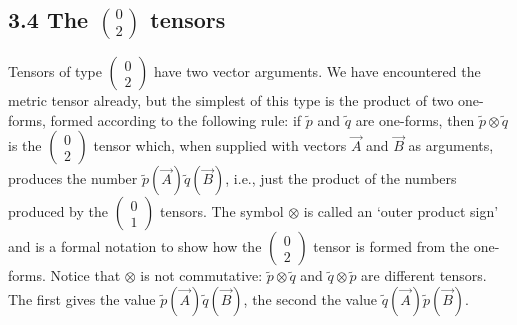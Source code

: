 \documentclass[12pt]{book}
\begin{document}
    \subsection{3.4 The \(\binom{0}{2}\) tensors}
    Tensors of type \(\left(\begin{array}{c} 0 \\ 2 \end{array}\right)\) have two vector arguments. We have encountered the metric tensor already, but the simplest of this type is the product of two one-forms, formed according to the following rule: if \(\tilde{p}\) and \(\tilde{q}\) are one-forms, then \(\tilde{p} \otimes \tilde{q}\) is the \(\left(\begin{array}{c} 0 \\ 2 \end{array}\right)\) tensor which, when supplied with vectors \(\vec{A}\) and \(\vec{B}\) as arguments, produces the number \(\tilde{p}(\vec{A}) \tilde{q}(\vec{B})\), i.e., just the product of the numbers produced by the \(\left(\begin{array}{c} 0 \\ 1 \end{array}\right)\) tensors. The symbol \(\otimes\) is called an ‘outer product sign’ and is a formal notation to show how the \(\left(\begin{array}{c} 0 \\ 2 \end{array}\right)\) tensor is formed from the one-forms. Notice that \(\otimes\) is not commutative: \(\tilde{p} \otimes \tilde{q}\) and \(\tilde{q} \otimes \tilde{p}\) are different tensors. The first gives the value \(\tilde{p}(\vec{A}) \tilde{q}(\vec{B})\), the second the value \(\tilde{q}(\vec{A}) \tilde{p}(\vec{B})\).
    
\end{document}
